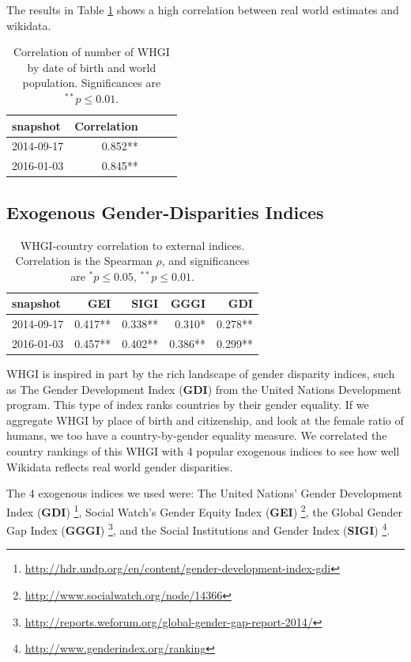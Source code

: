 \documentclass[letterpaper]{article}
\begin{document}
The results in Table \ref{table:worldpop} shows a high correlation between real
world estimates and wikidata.
\begin{table}
\caption{Correlation of number of WHGI by date of birth and world population. Significances are $ ^{**}p\leq 0.01$.}
\label{table:worldpop}
\begin{tabular}{lrrrr}
\toprule
snapshot &  Correlation \\
\midrule
2014-09-17 & 0.852**  \\
2016-01-03 & 0.845**  \\
\bottomrule
\end{tabular}
\end{table}

\subsection{Exogenous Gender-Disparities Indices}
\begin{table}
\caption{WHGI-country correlation to external indices. Correlation is the Spearman $\rho$, and significances are $ ^*p\leq 0.05 $, $ ^{**}p\leq 0.01$.}
\label{table:scores}
\begin{tabular}{lrrrr}
\toprule
snapshot &  GEI &  SIGI &  GGGI &  GDI  \\
\midrule
2014-09-17 &  0.417** &       0.338** &          0.310* &         0.278**  \\
2016-01-03 &  0.457** &       0.402** &          0.386** &         0.299**  \\
\bottomrule
\end{tabular}
\end{table}

WHGI is inspired in part by the rich landscape of gender disparity indices, such as The Gender Development Index (\textbf{GDI}) from the United Nations Development program. This type of index ranks countries by their gender equality. If we aggregate WHGI by place of birth and citizenship, and look at the female ratio of humans, we too have a country-by-gender equality measure.  We correlated the country rankings of this WHGI with 4 popular exogenous indices to see how well Wikidata reflects real world gender disparities. 

The 4 exogenous indices we used were: The United Nations' Gender Development Index (\textbf{GDI})  \footnote{\url{http://hdr.undp.org/en/content/gender-development-index-gdi}},  Social Watch's Gender Equity Index (\textbf{GEI}) \footnote{\url{http://www.socialwatch.org/node/14366}},  the Global Gender Gap Index (\textbf{GGGI}) \footnote{\url{http://reports.weforum.org/global-gender-gap-report-2014/}}, and the Social Institutions and Gender Index (\textbf{SIGI}) \footnote{\url{http://www.genderindex.org/ranking}}. 
\end{document}
